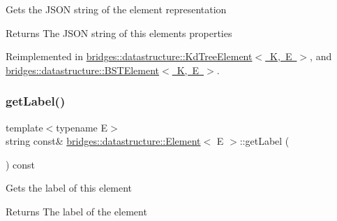 Gets the J\+S\+ON string of the element representation \begin{DoxyReturn}{Returns}
The J\+S\+ON string of this element\textquotesingle{}s properties 
\end{DoxyReturn}


Reimplemented in \mbox{\hyperlink{classbridges_1_1datastructure_1_1_kd_tree_element_a5413ecaf152e3df5fb45dd85da812888}{bridges\+::datastructure\+::\+Kd\+Tree\+Element$<$ K, E $>$}}, and \mbox{\hyperlink{classbridges_1_1datastructure_1_1_b_s_t_element_a8f962a01b6e0eff59abeee7768264fd9}{bridges\+::datastructure\+::\+B\+S\+T\+Element$<$ K, E $>$}}.

\mbox{\label{classbridges_1_1datastructure_1_1_element_a44949edf79379a4d48490e98c15992a6}} 
\subsubsection{\texorpdfstring{getLabel()}{getLabel()}}
{\footnotesize\ttfamily template$<$typename E$>$ \\
string const\& \mbox{\hyperlink{classbridges_1_1datastructure_1_1_element}{bridges\+::datastructure\+::\+Element}}$<$ E $>$\+::get\+Label (\begin{DoxyParamCaption}{ }\end{DoxyParamCaption}) const\hspace{0.3cm}{\ttfamily [inline]}}

Gets the label of this element \begin{DoxyReturn}{Returns}
The label of the element 
\end{DoxyReturn}
\mbox{\label{classbridges_1_1datastructure_1_1_element_a0d43c0aaa96192b49dfc0a499d63a325}} 
